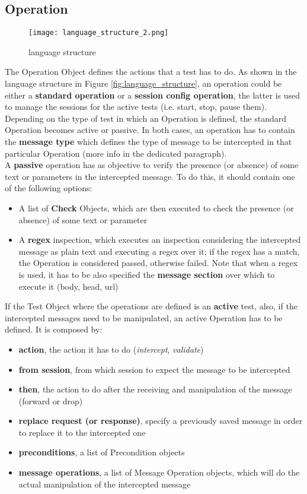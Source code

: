 \subsection{Operation}
\label{sec:operation}
\begin{wrapfigure}{r}{0.4\textwidth}
    \texttt{[image: language\_structure\_2.png]}
    \caption{language structure}
    \label{fig:language_structure_2}
\end{wrapfigure}

The Operation Object defines the actions that a test has to do. As shown in the language structure in Figure \ref{fig:language_structure}, an operation could be either a \textbf{standard operation} or a \textbf{session config operation}, the latter is used to manage the sessions for the active tests (i.e. start, stop, pause them). Depending on the type of test in which an Operation is defined, the standard Operation becomes active or passive.
In both cases, an operation has to contain the \textbf{message type} which defines the type of message to be intercepted in that particular Operation (more info in the dedicated paragraph).
\\A \textbf{passive} operation has as objective to verify the presence (or absence) of some text or parameters in the intercepted message. To do this, it should contain one of the following options:
\begin{itemize}
    \item A list of \textbf{Check} Objects, which are then executed to check the presence (or absence) of some text or parameter
    \item A \textbf{regex} inspection, which executes an inspection considering the intercepted message as plain text and executing a regex over it; if the regex has a match, the Operation is considered passed, otherwise failed. Note that when a regex is used, it has to be also specified the \textbf{message section} over which to execute it (body, head, url)
\end{itemize}

If the Test Object where the operations are defined is an \textbf{active} test, also, if the intercepted messages need to be manipulated, an active Operation has to be defined. It is composed by:
\begin{itemize}
    \item \textbf{action}, the action it has to do (\textit{intercept}, \textit{validate})
    \item \textbf{from session}, from which session to expect the message to be intercepted
    \item \textbf{then}, the action to do after the receiving and manipulation of the message (forward or drop)
    \item \textbf{replace request (or response)}, specify a previously saved message in order to replace it to the intercepted one
    \item \textbf{preconditions}, a list of Precondition objects
    \item \textbf{message operations}, a list of Message Operation objects, which will do the actual manipulation of the intercepted message
\end{itemize}

